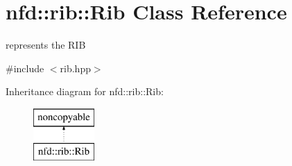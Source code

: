 \hypertarget{classnfd_1_1rib_1_1Rib}{}\section{nfd\+:\+:rib\+:\+:Rib Class Reference}
\label{classnfd_1_1rib_1_1Rib}


represents the R\+IB  




{\ttfamily \#include $<$rib.\+hpp$>$}

Inheritance diagram for nfd\+:\+:rib\+:\+:Rib\+:\begin{figure}[H]
\begin{center}
\leavevmode
\includegraphics[height=2.000000cm]{classnfd_1_1rib_1_1Rib}
\end{center}
\end{figure}
